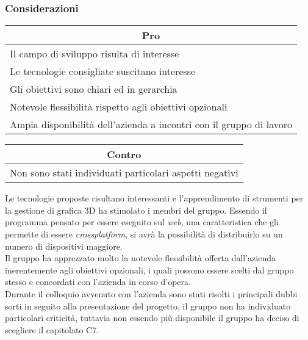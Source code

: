 \subsubsection{Considerazioni}
\begin{minipage}[t]{0.45\linewidth}
    \vspace{0pt}
    {\renewcommand{\arraystretch}{1.5}
    \begin{tabular}{p{1\linewidth}}
        \multicolumn{1}{c}{\textbf{Pro}} \\
        \midrule
		Il campo di sviluppo risulta di interesse \\
		Le tecnologie consigliate suscitano interesse \\
		Gli obiettivi sono chiari ed in gerarchia \\
		Notevole flessibilità rispetto agli obiettivi opzionali \\
		Ampia disponibilità dell'azienda a incontri con il gruppo di lavoro \\
        \hline
    \end{tabular}
    }
\end{minipage}
\hspace{0.05\linewidth}
\begin{minipage}[t]{0.45\linewidth}
    \vspace{0pt}
    {\renewcommand{\arraystretch}{1.5}
    \begin{tabular}{p{1\linewidth}}
        \multicolumn{1}{c}{\textbf{Contro}} \\
        \midrule
        Non sono stati individuati particolari aspetti negativi \\
        \hline
    \end{tabular}
    }
\end{minipage}
\vspace{1em}

\noindent
Le tecnologie proposte risultano interessanti e l'apprendimento di strumenti per la gestione di grafica 3D ha stimolato i membri del gruppo.
Essendo il programma pensato per essere eseguito sul \textit{web}, una caratteristica che gli permette di essere \textit{crossplatform}, si avrà la possibilità di distribuirlo su un numero di dispositivi maggiore.\\
Il gruppo ha apprezzato molto la notevole flessibilità offerta dall'azienda inerentemente agli obiettivi opzionali, i quali possono essere scelti dal gruppo stesso e concordati con l'azienda in corso d'opera.\\
Durante il colloquio avvenuto con l'azienda sono stati risolti i principali dubbi sorti in seguito alla presentazione del progetto, il gruppo non ha individuato particolari criticità, tuttavia non essendo più disponibile il gruppo ha deciso di scegliere il capitolato C7.
